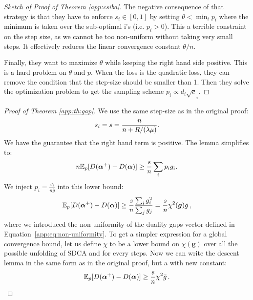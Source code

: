 \begin{subappendices}
\begin{proof}[Sketch of Proof of Theorem \ref{app:csiba}]
The negative consequence of that strategy is that they have to enforce $s_i \in [0,1]$ by setting
$\theta < \min_i p_i$ where the minimum is taken over the sub-optimal i's (i.e. $p_i>0$).
This a terrible constraint on the step size, as we cannot be too non-uniform without taking very small steps.
It effectively reduces the linear convergence constant $\theta /n$.

Finally, they want to maximize $\theta$ while keeping the right hand side positive.
This is a hard problem on $\theta$ and $p$.
When the loss is the quadratic loss, they can remove the condition that the step-size should be smaller than 1.
Then they solve the optimization problem to get the sampling scheme $p_i \propto d_i \sqrt c_i$.
\end{proof}

\begin{proof}[Proof of Theorem \ref{app:th:gap}]
    We use the same step-size as in the original proof:
    \begin{equation}
        s_i = s = \frac{n}{n+R/(\lambda \mu)}.
    \end{equation}
    We have the guarantee that the right hand term is positive. The lemma simplifies to:
    \begin{equation}
        n \mathbb E_p[D(\boldsymbol{\alpha}^+) - D(\boldsymbol{\alpha})]
        \geq \frac{s}{n} \sum_i p_i g_i.
    \end{equation}
    We inject $p_i= \frac{g_i}{n\bar g}$ into this lower bound:
    \begin{equation}
        \mathbb E_p[D(\boldsymbol{\alpha}^+) - D(\boldsymbol{\alpha})]
        \geq \frac{s}{n} \frac{\sum_i g_i^2}{\sum_j g_j}
        = \frac{s}{n} \chi^2(\bm g) \bar g\, ,
    \end{equation}
    where we introduced the non-uniformity of the duality gaps vector defined in Equation~\eqref{app:eq:non-uniformity}.
    To get a simpler expression for a global convergence bound, let us define $\chi$ to be a lower bound on $\chi(\bm g)$ over all the possible unfolding of SDCA and for every steps.
    Now we can write the descent lemma in the same form as in the original proof, but a with new constant:
    \begin{equation}
        \mathbb E_p[D(\boldsymbol{\alpha}^+) - D(\boldsymbol{\alpha})]
        \geq \frac{s}{n} \chi^2 \bar g\, .
    \end{equation}
\end{proof}


\end{subappendices}
